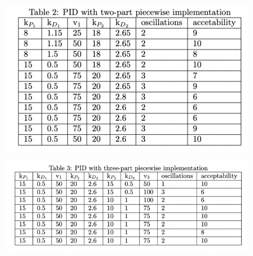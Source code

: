 \documentclass[12pt]{article}
\begin{document}
\begin{multicols}{2}
\begin{center}
    \includegraphics*[scale=0.5]{Table2.png}
\end{center}
\begin{center}
    \includegraphics*[scale=0.5]{Table3.png}
\end{center}


\end{multicols}
\end{document}
